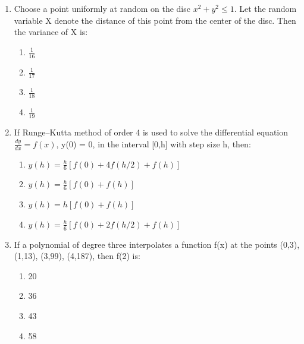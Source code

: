 \documentclass[journal,cmex10]{IEEEtran}
\theoremstyle{remark}
\numberwithin{equation}{enumi}
\numberwithin{figure}{enumi}
\begin{document}
\begin{enumerate}[label=\arabic*)]
    \item Choose a point uniformly at random on the disc $x^2 + y^2 \leq 1$. Let the random variable X denote the distance of this point from the center of the disc. Then the variance of X is:
    \bigskip
    \hfill {}
    \begin{enumerate}[label=\alph*)]
        \item $\frac{1}{16}$
        \item $\frac{1}{17}$
        \item $\frac{1}{18}$
        \item $\frac{1}{19}$
    \end{enumerate}
    \bigskip

    \item If Runge–Kutta method of order 4 is used to solve the differential equation $\frac{dy}{dx} = f(x)$, y(0) = 0, in the interval [0,h] with step size h, then:
    \bigskip
    \hfill {}
    \begin{enumerate}[label=\alph*)]
        \item $y(h) = \frac{h}{6} [f(0) + 4f(h/2) + f(h)]$
        \vspace{0.1cm}
        \item $y(h) = \frac{h}{6} [f(0) + f(h)]$
        \item $y(h) = h [f(0) + f(h)]$
        \item $y(h) = \frac{h}{6} [f(0) + 2f(h/2) + f(h)]$
    \end{enumerate}
    \bigskip

    \item If a polynomial of degree three interpolates a function f(x) at the points (0,3), (1,13), (3,99), (4,187), then f(2) is:
    \bigskip
    \hfill {}
    \begin{enumerate}[label=\alph*)]
        \item 20
        \item 36
        \item 43
        \item 58
    \end{enumerate}
    \bigskip


\end{enumerate}
\end{document}
